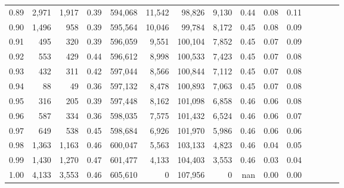 \begin{tabular}{rrrcrrrrrrrrrrr}
0.89 &   2,971 &  1,917 &                                       0.39 &  594,068 &   11,542 &   98,826 &    9,130 &  0.44 &  0.08 &                         0.11 \\
0.90 &   1,496 &    958 &                                       0.39 &  595,564 &   10,046 &   99,784 &    8,172 &  0.45 &  0.08 &                         0.09 \\
0.91 &     495 &    320 &                                       0.39 &  596,059 &    9,551 &  100,104 &    7,852 &  0.45 &  0.07 &                         0.09 \\
0.92 &     553 &    429 &                                       0.44 &  596,612 &    8,998 &  100,533 &    7,423 &  0.45 &  0.07 &                         0.08 \\
0.93 &     432 &    311 &                                       0.42 &  597,044 &    8,566 &  100,844 &    7,112 &  0.45 &  0.07 &                         0.08 \\
0.94 &      88 &     49 &                                       0.36 &  597,132 &    8,478 &  100,893 &    7,063 &  0.45 &  0.07 &                         0.08 \\
0.95 &     316 &    205 &                                       0.39 &  597,448 &    8,162 &  101,098 &    6,858 &  0.46 &  0.06 &                         0.08 \\
0.96 &     587 &    334 &                                       0.36 &  598,035 &    7,575 &  101,432 &    6,524 &  0.46 &  0.06 &                         0.07 \\
0.97 &     649 &    538 &                                       0.45 &  598,684 &    6,926 &  101,970 &    5,986 &  0.46 &  0.06 &                         0.06 \\
0.98 &   1,363 &  1,163 &                                       0.46 &  600,047 &    5,563 &  103,133 &    4,823 &  0.46 &  0.04 &                         0.05 \\
0.99 &   1,430 &  1,270 &                                       0.47 &  601,477 &    4,133 &  104,403 &    3,553 &  0.46 &  0.03 &                         0.04 \\
1.00 &   4,133 &  3,553 &                                       0.46 &  605,610 &        0 &  107,956 &        0 &   nan &  0.00 &                         0.00 \\
\bottomrule
\end{tabular}
